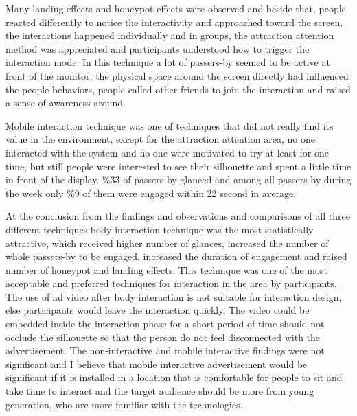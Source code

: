 Many landing effects and honeypot effects were observed and beside that, people reacted differently to notice the interactivity and approached toward the screen, the interactions happened individually and in groups, the attraction attention method was appreciated and participants understood how to trigger the interaction mode. In this technique a lot of passers-by seemed to be active at front of the monitor, the physical space around the screen directly had influenced the people behaviors, people called other friends to join the interaction and raised a sense of awareness around. 

Mobile interaction technique was one of techniques that did not really find its value in the environment, except for the attraction attention area, no one interacted with the system and no one were motivated to try at-least for one time, but still people were interested to see their silhouette and spent a little time in front of the display. \%33 of passers-by glanced and among all passers-by during the week only \%9 of them were engaged within 22 second in average.

At the conclusion from the findings and observations and comparisons of all three different techniques body interaction technique was the most statistically attractive, which received higher number of glances, increased the number of whole passers-by to be engaged, increased the duration of engagement and raised number of honeypot and landing effects. This technique was one of the most acceptable and preferred techniques for interaction in the area by participants. The use of ad video after body interaction is not suitable for interaction design, else participants would leave the interaction quickly, The video could be embedded inside the interaction phase for a short period of time should not occlude the silhouette so that the person do not feel disconnected with the advertisement. The non-interactive and mobile interactive findings were not significant and I believe that mobile interactive advertisement would be significant if it is installed in a location that is comfortable for people to sit and take time to interact and the target audience should be more from young generation, who are more familiar with the technologies.